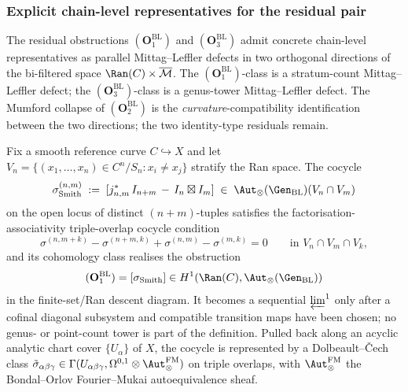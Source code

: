 \subsubsection*{Explicit chain-level representatives for the residual
pair}
\label{sec:residual-pair-chain-level}

The residual obstructions $(\mathbf{O}_1^{\mathrm{BL}})$ and
$(\mathbf{O}_3^{\mathrm{BL}})$ admit concrete chain-level
representatives as parallel Mittag--Leffler defects in two orthogonal
directions of the bi-filtered space $\Ran(C) \times \Mbar$. The
$(\mathbf{O}_1^{\mathrm{BL}})$-class is a
stratum-count Mittag--Leffler defect; the
$(\mathbf{O}_3^{\mathrm{BL}})$-class is a genus-tower Mittag--Leffler
defect. The Mumford collapse of $(\mathbf{O}_2^{\mathrm{BL}})$ is the
\emph{curvature}-compatibility identification between the two
directions; the two identity-type residuals remain.

\begin{proposition}
\label{prop:O1-BL-cech-cocycle}
Fix a smooth reference curve
$C \hookrightarrow X$ and let $V_n = \{(x_1, \dots, x_n) \in C^n/S_n :
x_i \neq x_j\}$ stratify the Ran space. The cocycle
\[
\sigma_{\mathrm{Smith}}^{(n, m)} \;:=\;
[j^*_{n, m}\,I_{n+m}\, -\, I_n \boxtimes I_m] \;\in\;
\Aut_\otimes(\Gen_{\mathrm{BL}})(V_n \cap V_m)
\]
on the open locus of distinct $(n+m)$-tuples satisfies the
factorisation-associativity triple-overlap cocycle condition
\[
\sigma^{(n, m+k)} - \sigma^{(n+m, k)} + \sigma^{(n, m)}
 - \sigma^{(m, k)} = 0
\qquad \text{in } V_n \cap V_m \cap V_k,
\]
and its cohomology class realises the obstruction
\[
(\mathbf{O}_1^{\mathrm{BL}}) = [\sigma_{\mathrm{Smith}}]
\in H^1(\Ran(C), \Aut_\otimes(\Gen_{\mathrm{BL}}))
\]
in the finite-set/Ran descent diagram.  It becomes a sequential
$\varprojlim^1$ only after a cofinal diagonal subsystem and compatible
transition maps have been chosen; no genus- or point-count tower is
part of the definition.
Pulled back along an acyclic analytic chart cover
$\{U_\alpha\}$ of $X$, the cocycle is represented by a
Dolbeault--\v{C}ech class
$\tilde\sigma_{\alpha\beta\gamma} \in
\Gamma(U_{\alpha\beta\gamma}, \Omega^{0,1} \otimes
\Aut_\otimes^{\mathrm{FM}})$ on triple overlaps, with
$\Aut_\otimes^{\mathrm{FM}}$ the Bondal--Orlov Fourier--Mukai
autoequivalence sheaf.
\end{proposition}

